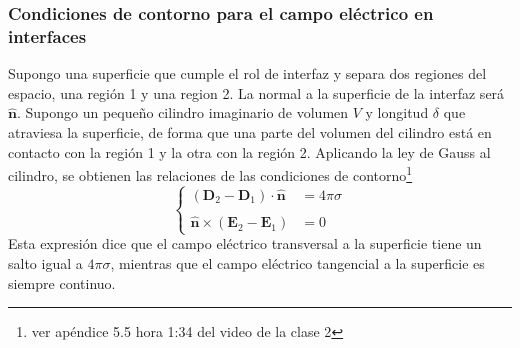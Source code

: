 \subsubsection{Condiciones de contorno para el campo eléctrico en interfaces}
Supongo una superficie que cumple el rol de interfaz y separa dos regiones del espacio, una región 1 y una region 2. La normal a la superficie de la interfaz será $\hat{\textbf{n}}$. Supongo un pequeño cilindro imaginario de volumen $V$ y longitud $\delta$ que atraviesa la superficie, de forma que una parte del volumen del cilindro está en contacto con la región 1 y la otra con la región 2. Aplicando la ley de Gauss al cilindro, se obtienen las relaciones de las condiciones de contorno\footnote{ver apéndice 5.5 hora 1:34 del video de la clase 2}
\begin{equation}
    \left\{
        \begin{matrix}
            (\textbf{D}_{2} - \textbf{D}_{1})\cdot \hat{\textbf{n}} & = 4\pi\sigma\\
            & \\
            \hat{\textbf{n}}\times (\textbf{E}_{2}-\textbf{E}_{1}) & = 0
        \end{matrix}
    \right.
    \label{ec:CondicionesdeContornoE}
\end{equation}
Esta expresión dice que el campo eléctrico transversal a la superficie tiene un salto igual a $4\pi \sigma$, mientras que el campo eléctrico tangencial a la superficie es siempre continuo.



